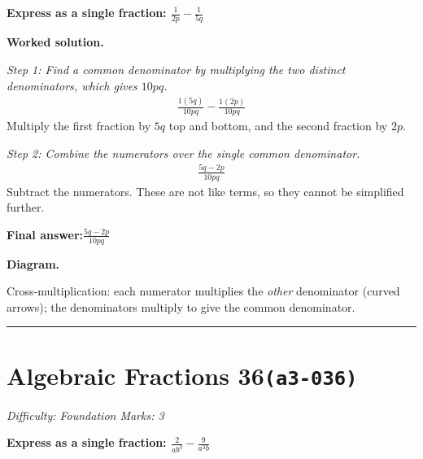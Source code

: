 \documentclass[11pt]{article}
\newcommand{\question}[1]{\par\medskip\noindent\textbf{#1}\par}
\begin{document}
\question{Express as a single fraction: \( \frac{1}{2p} - \frac{1}{5q} \)}

\textbf{Worked solution.}

\textit{Step 1: Find a common denominator by multiplying the two distinct denominators, which gives \( 10pq \).}
\[\begin{gathered}
\frac{1(5q)}{10pq} - \frac{1(2p)}{10pq}
\end{gathered}\]
Multiply the first fraction by \( 5q \) top and bottom, and the second fraction by \( 2p \).

\textit{Step 2: Combine the numerators over the single common denominator.}
\[\begin{gathered}
\frac{5q - 2p}{10pq}
\end{gathered}\]
Subtract the numerators. These are not like terms, so they cannot be simplified further.

\begin{answerbox}
\textbf{Final answer:}\quad \(\displaystyle \frac{5q - 2p}{10pq}\)
\end{answerbox}
\textbf{Diagram.}

\begin{center}
\end{center}
\small Cross-multiplication: each numerator multiplies the \emph{other} denominator (curved arrows); the denominators multiply to give the common denominator.\normalsize

\medskip\hrule

\section*{Algebraic Fractions 36\quad\small\texttt{(a3-036)}}
\textit{Difficulty: Foundation \quad\textbar\quad Marks: 3}

\question{Express as a single fraction: \( \frac{2}{ab^3} - \frac{9}{a^3b} \)}
\end{document}
